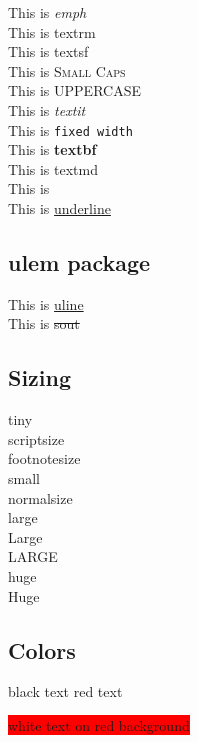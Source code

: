 \documentclass{article}
\begin{document}
  This is \emph{emph} \\
  This is \textrm{textrm} \\
  This is \textsf{textsf} \\
  This is \textsc{Small Caps} \\
  This is \uppercase{uPpeRcAsE} \\
  This is \textit{textit} \\
  This is \texttt{fixed width} \\
  This is \textbf{textbf} \\
  This is \textmd{textmd} \\
  This is  \\
  This is \underline{underline} \\

  \subsection{ulem package}

  \usepackage[normalem]{ulem}
  This is \uline{uline} \\
  This is \sout{sout} \\

  \subsection{Sizing}

  {\tiny tiny} \\
  {\scriptsize scriptsize} \\
  {\footnotesize footnotesize} \\
  {\small small} \\
  {\normalsize normalsize} \\
  {\large large} \\
  {\Large Large} \\
  {\LARGE LARGE} \\
  {\huge huge} \\
  {\Huge Huge} \\

  \subsection{Colors}

  \usepackage{xcolor}

  {black text \color{red}red text}

  \colorbox{red}{\color{white}white text on red background}
\end{document}
